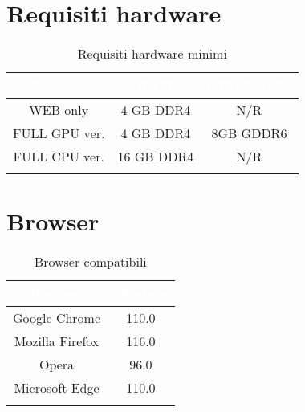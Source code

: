 \section{Requisiti hardware}
\begingroup
\setlength{\tabcolsep}{10pt}
\renewcommand{\arraystretch}{1.5}
\begin{xltabular}{\textwidth}{| c | c | c |}
    \hline
     \textbf{\textcolor{white}{Versione}} & \textbf{\textcolor{white}{RAM}} & \textbf{\textcolor{white}{GPU VRAM}}\\
    \hline
    \endhead
    WEB only & 4 GB DDR4 & N/R \\
    \hline
    FULL GPU ver.& 4 GB DDR4 & 8GB GDDR6 \\
    \hline
    FULL CPU ver.& 16 GB DDR4 & N/R \\
    \hline
     \caption{Requisiti hardware minimi}
    \label{tab:reqhard}
\end{xltabular}
\endgroup

\section{Browser}
\begingroup
\setlength{\tabcolsep}{10pt}
\renewcommand{\arraystretch}{1.5}
\begin{xltabular}{\textwidth}{| c | c |}
    \hline
     \textbf{\textcolor{white}{Browser}} & \textbf{\textcolor{white}{Versione}}\\
    \hline
    \endhead
    Google Chrome & 110.0 \\
    \hline
    Mozilla Firefox & 116.0 \\
    \hline
    Opera & 96.0 \\
    \hline
    Microsoft Edge & 110.0 \\
    \hline
     \caption{Browser compatibili}
    \label{tab:reqbrow}
\end{xltabular}
\endgroup


